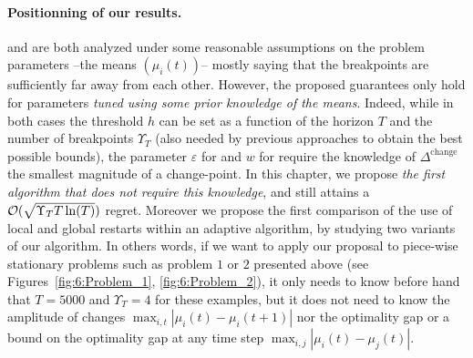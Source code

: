 

\paragraph{Positionning of our results.}
%
\CUSUMUCB{} and \MUCB{} are both analyzed under some reasonable assumptions on the problem parameters --the means $(\mu_i(t))$-- mostly saying that the breakpoints are sufficiently far away from each other.
%
However, the proposed guarantees only hold for parameters \emph{tuned using some prior knowledge of the means}.
Indeed, while in both cases the threshold $h$ can be set as a function of the horizon $T$ and the number of breakpoints  $\Upsilon_T$ (also needed by previous approaches to obtain the best possible bounds), the parameter $\varepsilon$ for \CUSUM{} and $w$ for \MUCB{} require the knowledge of $\Delta^{\text{change}}$ the smallest magnitude of a change-point.
%
In this chapter, we propose \emph{the first algorithm that does not require this knowledge}, and still attains a $\mathcal{O}(\sqrt{\Upsilon_T T\ln(T)})$ regret.
Moreover we propose the first comparison of the use of local and global restarts within an adaptive algorithm, by studying two variants of our algorithm.
%
In others words, if we want to apply our proposal to piece-wise stationary problems such as problem $1$ or $2$ presented above (see Figures~\ref{fig:6:Problem_1}, \ref{fig:6:Problem_2}),
it only needs to know before hand that $T=5000$ and $\Upsilon_T=4$ for these examples, but it does not need to know the amplitude of changes $\max_{i,t} |\mu_i(t) - \mu_i(t+1)|$ nor the optimality gap or a bound on the optimality gap at any time step $\max_{i,j} |\mu_i(t) - \mu_j(t)|$.


